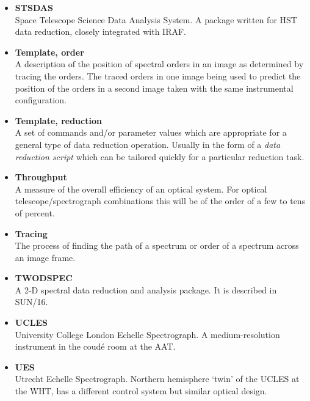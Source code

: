 \documentclass[twoside,11pt]{article}
\newcommand{\htmlref}[2]{#1}
\newcommand{\xref}[3]{#1}
\begin{document}
\begin{itemize}
\item {\bf\label{gl_stsdas}STSDAS}\\
      Space Telescope Science Data Analysis System.  A package written
      for \htmlref{HST}{gl_hst} data reduction, closely integrated with IRAF.

\item {\bf\label{gl_template_order}Template, order}\\
      A description of the position of spectral orders in an image
      as determined by tracing the orders.  The traced orders in one image
      being used to predict the position of the orders in a second image
      taken with the same instrumental configuration.

\item {\bf\label{gl_template_reduct}Template, reduction}\\
      A set of commands and/or parameter values which are appropriate for a
      general type of data reduction operation.  Usually in the form of a
      {\sl data reduction script} which can be tailored quickly for a
      particular reduction task.

\item {\bf\label{gl_throughput}Throughput}\\
      A measure of the overall efficiency of an optical system.
      For optical telescope/spectrograph combinations this will be of
      the order of a few to tens of percent.

\item {\bf\label{gl_tracing}Tracing}\\
      The process of finding the path of a spectrum or order of a spectrum
      across an image frame.

\item {\bf\label{gl_twodspec}TWODSPEC}\\
      A 2-D spectral data reduction and analysis package. It is described in
      \xref{SUN/16}{sun16}{}.

\item {\bf\label{gl_ucles}UCLES}\\
      University College London Echelle Spectrograph.
      A medium-resolution instrument in the coud\'{e} room at the
      \htmlref{AAT}{gl_aao_aat}.

\item {\bf\label{gl_ues}UES}\\
      Utrecht Echelle Spectrograph.
      Northern hemisphere `twin' of the UCLES at the WHT, has a
      different control system but similar optical design.


\end{itemize}
\end{document}
